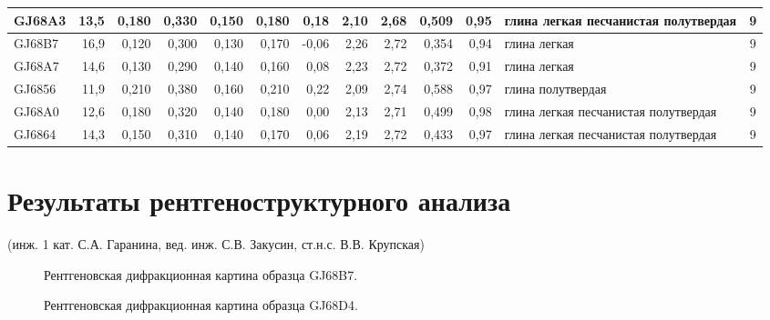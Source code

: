 \begin{sidewaystable}[p]
\begin{tabular}{@{}|l|r|r|r|r|r|r|r|r|r|r|l|c|@{}}
    GJ68A3          & 13,5       & 0,180                        & 0,330   & 0,150  & 0,180  & 0,18     & 2,10     & 2,68      & 0,509   & 0,95     & глина легкая   песчанистая полутвердая       & 9   \\ \hline
    GJ68B7          & 16,9       & 0,120                        & 0,300   & 0,130  & 0,170  & -0,06    & 2,26     & 2,72      & 0,354   & 0,94     & глина легкая       & 9   \\ \hline
    GJ68A7          & 14,6       & 0,130                        & 0,290   & 0,140  & 0,160  & 0,08     & 2,23     & 2,72      & 0,372   & 0,91     & глина легкая                              & 9   \\ \hline
    GJ6856          & 11,9       & 0,210                        & 0,380   & 0,160  & 0,210  & 0,22     & 2,09     & 2,74      & 0,588   & 0,97     & глина полутвердая                            & 9   \\ \hline
    GJ68A0          & 12,6       & 0,180                        & 0,320   & 0,140  & 0,180  & 0,00     & 2,13     & 2,71      & 0,499   & 0,98     & глина легкая   песчанистая полутвердая       & 9   \\ \hline
    GJ6864          & 14,3       & 0,150                        & 0,310   & 0,140  & 0,170  & 0,06     & 2,19     & 2,72      & 0,433   & 0,97     & глина легкая   песчанистая полутвердая       & 9   \\ \hline
    \bottomrule 
    \end{tabular}
    \end{sidewaystable}


\chapter{Результаты рентгеноструктурного анализа}\label{app:difrac}
(инж. 1 кат. С.А. Гаранина, вед. инж. С.В. Закусин, ст.н.с. В.В. Крупская)

\begin{figure}[ht]
    \caption{Рентгеновская дифракционная картина образца GJ68B7.}\label{fig:fig}
  \end{figure}

  \begin{figure}[ht]
    \caption{Рентгеновская дифракционная картина образца GJ68D4.}\label{fig:fig}
  \end{figure}

